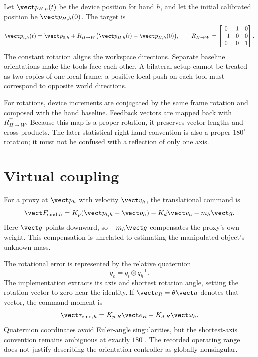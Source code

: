 Let $\vect p_{H,h}(t)$ be the device position for hand $h$, and let the initial calibrated position be $\vect p_{H,h}(0)$. The target is
\begin{equation}
\vect p_{t,h}(t)=\vect p_{0,h}+R_{H\rightarrow W}
\bigl(\vect p_{H,h}(t)-\vect p_{H,h}(0)\bigr),
\qquad
R_{H\rightarrow W}=\begin{bmatrix}0&1&0\\-1&0&0\\0&0&1\end{bmatrix}.
\label{eq:haptic-map}
\end{equation}
The constant rotation aligns the workspace directions. Separate baseline orientations make the tools face each other. A bilateral setup cannot be treated as two copies of one local frame: a positive local push on each tool must correspond to opposite world directions.

For rotations, device increments are conjugated by the same frame rotation and composed with the hand baseline. Feedback vectors are mapped back with $R_{H\rightarrow W}^\top$. Because this map is a proper rotation, it preserves vector lengths and cross products. The later statistical right-hand convention is also a proper $180^\circ$ rotation; it must not be confused with a reflection of only one axis.

\section{Virtual coupling}

For a proxy at $\vect p_h$ with velocity $\vect v_h$, the translational command is
\begin{equation}
\vect F_{\mathrm{cmd},h}=K_p(\vect p_{t,h}-\vect p_h)-K_d\vect v_h-m_h\vect g.
\label{eq:translation-coupling}
\end{equation}
Here $\vect g$ points downward, so $-m_h\vect g$ compensates the proxy's own weight. This compensation is unrelated to estimating the manipulated object's unknown mass.

The rotational error is represented by the relative quaternion
\begin{equation}
q_e=q_t\otimes q_h^{-1}.
\end{equation}
The implementation extracts its axis and shortest rotation angle, setting the rotation vector to zero near the identity. If $\vect e_R=\theta\vect a$ denotes that vector, the command moment is
\begin{equation}
\vect \tau_{\mathrm{cmd},h}=K_{p,R}\vect e_R-K_{d,R}\vect\omega_h.
\label{eq:rotation-coupling}
\end{equation}
Quaternion coordinates avoid Euler-angle singularities, but the shortest-axis convention remains ambiguous at exactly $180^\circ$. The recorded operating range does not justify describing the orientation controller as globally nonsingular.

